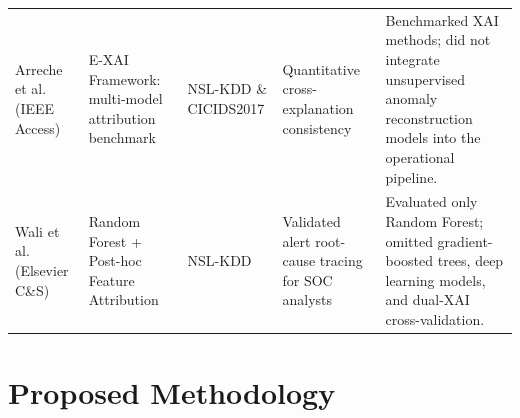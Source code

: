 \documentclass[10pt,twocolumn]{article}
\begin{document}
\begin{table}[t]
{\begin{tabular}{p{2.5cm}p{3.2cm}p{2.2cm}p{3.5cm}p{5.8cm}}
\addlinespace
Arreche et al. (IEEE Access) & E-XAI Framework: multi-model attribution benchmark & NSL-KDD \& CICIDS2017 & Quantitative cross-explanation consistency & Benchmarked XAI methods; did not integrate unsupervised anomaly reconstruction models into the operational pipeline. \\
\addlinespace
Wali et al. (Elsevier C\&S) & Random Forest + Post-hoc Feature Attribution & NSL-KDD & Validated alert root-cause tracing for SOC analysts & Evaluated only Random Forest; omitted gradient-boosted trees, deep learning models, and dual-XAI cross-validation. \\
\bottomrule
\end{tabular}%
}
\end{table}

\section{Proposed Methodology}

\begin{table}[htbp]
\caption{Dataset Partitioning and Class Distribution in NSL-KDD}
\label{tab:class_dist}
\centering
{}
\end{table}
\end{document}
